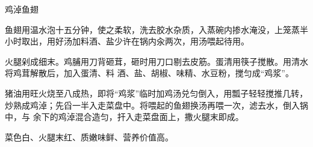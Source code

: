 \begin{recipe}{鸡淖鱼翅}

\ingredients


\preparation

\step 鱼翅用温水泡十五分钟，使之柔软，洗去胶水杂质，入蒸碗内掺水淹没，上笼蒸半
小时取出，用好汤加料酒、盐少许在锅内汆两次，用汤喂起待用。

\step 火腿剁成细末。鸡脯用刀背砸茸，砸时用刀口剔去皮筋。蛋清用筷子搅散。用清水
将鸡茸解散后，加入蛋清、料 酒、盐、胡椒、味精、水豆粉，搅匀成“鸡浆”。

\step 猪油用旺火烧至八成热，即将“鸡浆”临时加鸡汤兑匀倒入，用瓢子轻轻搅推几转，
炒熟成鸡淖；先舀一半入走菜盘中。将喂起的鱼翅换汤再喂一次，滤去水，倒入锅中，与
余下的鸡淖混合造匀，扞入走菜盘面上，撒火腿末即成。

\features

菜色白、火腿末红、质嫩味鲜、营养价值高。

\end{recipe}


